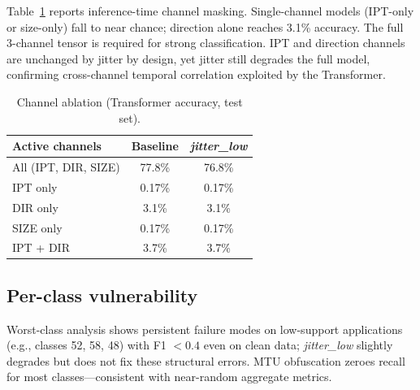 Table~\ref{tab:ablation} reports inference-time channel masking. Single-channel models
(IPT-only or size-only) fall to near chance; direction alone reaches 3.1\% accuracy.
The full 3-channel tensor is required for strong classification. IPT and direction
channels are unchanged by jitter by design, yet jitter still degrades the full model,
confirming cross-channel temporal correlation exploited by the Transformer.

\begin{table}[t]
  \centering
  \caption{Channel ablation (Transformer accuracy, test set).}
  \label{tab:ablation}
  \footnotesize
  \begin{tabular}{@{}lcc@{}}
    \toprule
    Active channels & Baseline & \emph{jitter\_low} \\
    \midrule
    All (IPT, DIR, SIZE) & 77.8\% & 76.8\% \\
    IPT only & 0.17\% & 0.17\% \\
    DIR only & 3.1\% & 3.1\% \\
    SIZE only & 0.17\% & 0.17\% \\
    IPT + DIR & 3.7\% & 3.7\% \\
    \bottomrule
  \end{tabular}
\end{table}

\subsection{Per-class vulnerability}

Worst-class analysis shows persistent failure modes on low-support applications (e.g.,
classes 52, 58, 48) with F1 $<0.4$ even on clean data; \emph{jitter\_low} slightly
degrades but does not fix these structural errors. MTU obfuscation zeroes recall for
most classes---consistent with near-random aggregate metrics.

